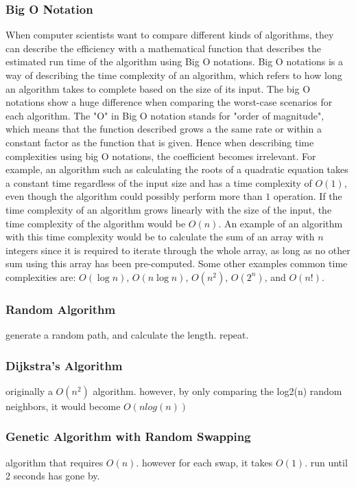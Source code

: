 \documentclass{article}
\begin{document}
\subsubsection{Big O Notation}\label{Big O}
When computer scientists want to compare different kinds of algorithms, they can describe the efficiency with a mathematical function that describes the estimated run time of the algorithm using Big O notations. Big O notations is a way of describing the time complexity of an algorithm, which refers to how long an algorithm takes to complete based on the size of its input. The big O notations show a huge difference when comparing the worst-case scenarios for each algorithm.
\newline
 The "O" in Big O notation stands for "order of magnitude", which means that the function described grows a the same rate or within a constant factor as the function that is given. Hence when describing time complexities using big O notations, the coefficient becomes irrelevant. For example, an algorithm such as calculating the roots of a quadratic equation takes a constant time regardless of the input size and has a time complexity of $O(1)$, even though the algorithm could possibly perform more than $1$ operation. If the time complexity of an algorithm grows linearly with the size of the input, the time complexity of the algorithm would be $O(n)$. An example of an algorithm with this time complexity would be to calculate the sum of an array with $n$ integers since it is required to iterate through the whole array, as long as no other sum using this array has been pre-computed. Some other examples common time complexities are: $O(\log{n})$, $O(n \log{n})$, $O(n^2)$, $O(2^n)$, and $O(n!)$.


\newline

\subsubsection{Random Algorithm}\label{Dijkstras}
generate a random path, and calculate the length. repeat.

\subsubsection{Dijkstra's Algorithm}\label{Dijkstras}
originally a $O(n^2)$ algorithm. however, by only comparing the log2(n) random neighbors, it would become $O(nlog(n))$


\subsubsection{Genetic Algorithm with Random Swapping}\label{Random Swapping}
algorithm that requires $O(n)$. however for each swap, it takes $O(1)$. run until 2 seconds has gone by.
\end{document}
